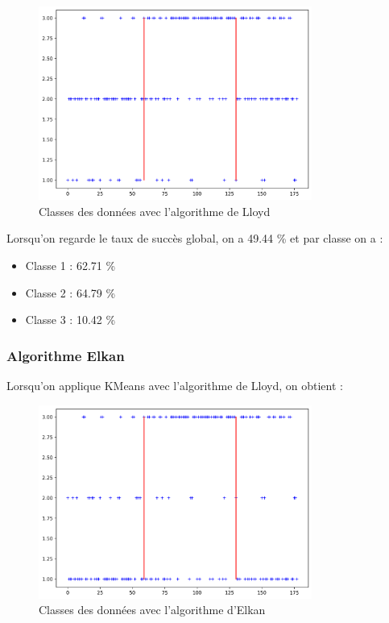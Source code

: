 \documentclass[a4paper,12pt]{article}
\begin{document}
\newpage

\begin{figure}[h!] %
   \centering
   \includegraphics[width=0.8\textwidth]{lloyd.png} %
   \caption{Classes des données avec l'algorithme de Lloyd}
   \label{fig:lloyd} %
\end{figure}

Lorsqu'on regarde le taux de succès global, on a 49.44 \% et par classe on a : \\
\begin{itemize}
\item Classe 1 : 62.71 \%
\item Classe 2 : 64.79 \%
\item Classe 3 : 10.42 \%
\end{itemize}


\subsubsection{Algorithme Elkan}
Lorsqu'on applique KMeans avec l'algorithme de Lloyd, on obtient :

\begin{figure}[h!] %
   \centering
   \includegraphics[width=0.8\textwidth]{elkan.png} %
   \caption{Classes des données avec l'algorithme d'Elkan}
   \label{fig:lloyd} %
\end{figure}
\end{document}

